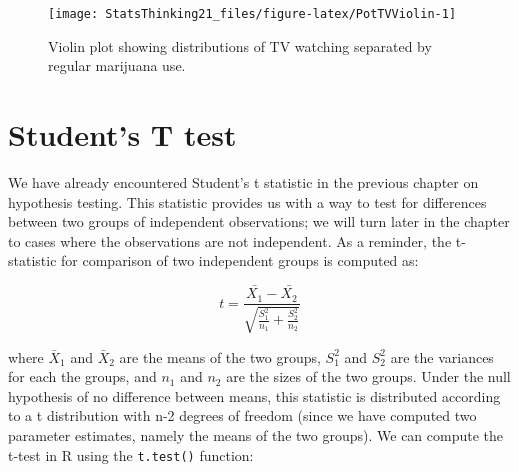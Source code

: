 \documentclass[]{book}
\newenvironment{Shaded}{\begin{snugshade}}{\end{snugshade}}
\newcommand{\KeywordTok}[1]{\textcolor[rgb]{0.13,0.29,0.53}{\textbf{#1}}}
\newcommand{\DataTypeTok}[1]{\textcolor[rgb]{0.13,0.29,0.53}{#1}}
\newcommand{\DecValTok}[1]{\textcolor[rgb]{0.00,0.00,0.81}{#1}}
\newcommand{\FloatTok}[1]{\textcolor[rgb]{0.00,0.00,0.81}{#1}}
\newcommand{\StringTok}[1]{\textcolor[rgb]{0.31,0.60,0.02}{#1}}
\newcommand{\CommentTok}[1]{\textcolor[rgb]{0.56,0.35,0.01}{\textit{#1}}}
\newcommand{\OperatorTok}[1]{\textcolor[rgb]{0.81,0.36,0.00}{\textbf{#1}}}
\newcommand{\NormalTok}[1]{#1}
\theoremstyle{definition}
\theoremstyle{definition}
\theoremstyle{definition}
\theoremstyle{remark}
\begin{document}
\begin{Shaded}
\end{Shaded}

\begin{figure}
\texttt{[image: StatsThinking21\_files/figure-latex/PotTVViolin-1]} \caption{Violin plot showing distributions of TV watching separated by regular marijuana use.}\label{fig:PotTVViolin}
\end{figure}

\section{Student's T test}\label{students-t-test}

We have already encountered Student's t statistic in the previous
chapter on hypothesis testing. This statistic provides us with a way to
test for differences between two groups of independent observations; we
will turn later in the chapter to cases where the observations are not
independent. As a reminder, the t-statistic for comparison of two
independent groups is computed as:

\[
t = \frac{\bar{X_1} - \bar{X_2}}{\sqrt{\frac{S_1^2}{n_1} + \frac{S_2^2}{n_2}}}
\]

where \(\bar{X}_1\) and \(\bar{X}_2\) are the means of the two groups,
\(S^2_1\) and \(S^2_2\) are the variances for each the groups, and
\(n_1\) and \(n_2\) are the sizes of the two groups. Under the null
hypothesis of no difference between means, this statistic is distributed
according to a t distribution with n-2 degrees of freedom (since we have
computed two parameter estimates, namely the means of the two groups).
We can compute the t-test in R using the \texttt{t.test()} function:
\end{document}
